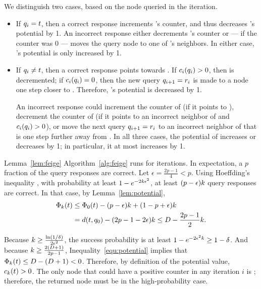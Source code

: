 \begin{emptyproof}
We distinguish two cases, based on the node queried in the  iteration.
\begin{itemize}
\item If $\Query[i] = \Target$, then a correct response increments 
\Target's counter, and thus decreases \Target's potential by 1.
An incorrect response either decrements \Target's counter
or --- if the counter was 0 --- moves the query node to one of
\Target's neighbors.
In either case, \Target's potential is only increased by 1.
\item If $\Query[i] \neq \Target$, then a correct response points
towards \Target. 
If $\Counter[i]{\Query[i]} > 0$, then \Counter{\Query[i]} is decremented;
if $\Counter[i]{\Query[i]} = 0$,
then the new query $\Query[i+1] = \Response[i]$ is made to a node one
step closer to \Target.
Therefore, \Target's potential is decreased by 1.

An incorrect response could increment the counter of \Query[i]
(if it points to \Query[i]),
decrement the counter of \Query[i]
(if it points to an incorrect neighbor of \Query[i] and
$\Counter[i]{\Query[i]} > 0$),
or move the next query $\Query[i+1] = \Response[i]$ to an incorrect
neighbor of \Query[i] that is one step further away from \Target.
In all three cases, the potential of \Target increases or decreases by 1;
in particular, it at most increases by 1.\QED
\end{itemize}
\end{emptyproof}

\begin{extraproof}{Lemma~\ref{lem:feige}}
Algorithm~\ref{alg:feige} runs for \NumQuery iterations.
In expectation, a $p$ fraction of the query responses are correct.
Let $\epsilon = \frac{2p - 1}{4} < p$.
Using Hoeffding's inequality \cite{hoeffding:1963:probability},
with probability at least $1 - e^{- 2 k \epsilon^2}$,
at least $(p - \epsilon) k$ query responses are correct.
In that case, by Lemma~\ref{lem:potential},
\begin{align}
\Potential[\Target]{\NumQuery}
& \leq \Potential[\Target]{0} - (p - \epsilon) \NumQuery +
(1- p + \epsilon) \NumQuery \nonumber
\\ & = \Dis{\Target}{\Query[0]} - (2p - 1 - 2\epsilon) \NumQuery
\leq D - \frac{2p-1}{2} \NumQuery. \label{equ:potential}
\end{align}

Because $k \geq \frac{\ln(1/\delta)}{2 \epsilon^2}$,
the success probability is at least
$1 - e^{- 2 \epsilon^2 k} \geq 1 - \delta$.
And because $k \geq \frac{2 (D+1)}{2p - 1}$,
Inequality~\ref{equ:potential} implies that
$\Potential[\Target]{\NumQuery} \leq D - (D+1) < 0$.
Therefore, by definition of the potential value,
$\Counter[\NumQuery]{\Target} > 0$.
The only node that could have a positive counter
in any iteration $i$ is \Query[i];
therefore, the returned node must be \Target in the high-probability case.
\end{extraproof}

